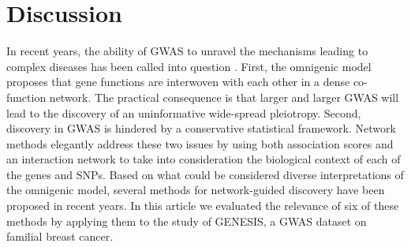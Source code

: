 \documentclass[10pt,letterpaper]{article}
\begin{document}
\section{Discussion}

In recent years, the ability of GWAS to unravel the mechanisms leading to complex diseases has been called into question \cite{boyle_expanded_2017}. First, the omnigenic model proposes that gene functions are interwoven with each other in a dense co-function network. The practical consequence is that larger and larger GWAS will lead to the discovery of an uninformative wide-spread pleiotropy. Second, discovery in GWAS is hindered by a conservative statistical framework. Network methods elegantly address these two issues by using both association scores and an interaction network to take into consideration the biological context of each of the genes and SNPs. Based on what could be considered diverse interpretations of the omnigenic model, several methods for network-guided discovery have been proposed in recent years. In this article we evaluated the relevance of six of these methods by applying them to the study of GENESIS, a GWAS dataset on familial breast cancer.
\end{document}
